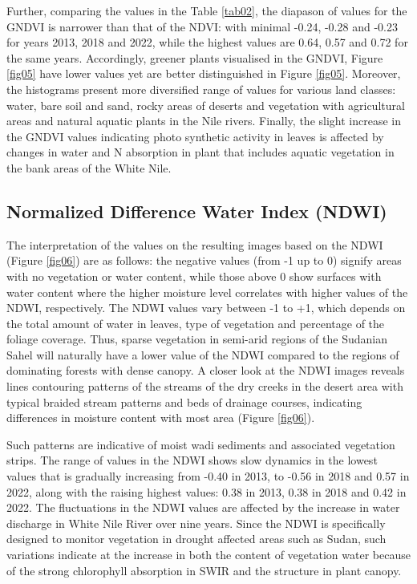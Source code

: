 \documentclass[jimaging,article,submit,pdftex,moreauthors]{Definitions/mdpi}
\begin{document}
Further, comparing the values in the Table \ref{tab02}, the diapason of values for the GNDVI is narrower than that of the NDVI: with minimal -0.24, -0.28 and -0.23 for years 2013, 2018 and 2022, while the highest values are 0.64, 0.57 and 0.72 for the same years. Accordingly, greener plants visualised in the GNDVI, Figure \ref{fig05} have lower values yet are better distinguished in Figure \ref{fig05}. Moreover, the histograms present more diversified range of values for various land classes: water, bare soil and sand, rocky areas of deserts and vegetation with agricultural areas and natural aquatic plants in the Nile rivers. Finally, the slight increase in the GNDVI values indicating photo synthetic activity in leaves is affected by changes in water and N absorption in plant that includes aquatic vegetation in the bank areas of the White Nile. 

\subsection{Normalized Difference Water Index (NDWI)}

The interpretation of the values on the resulting images based on the NDWI (Figure \ref{fig06}) are as follows: the negative values (from -1 up to 0) signify areas with no vegetation or water content, while those above 0 show surfaces with water content where the higher moisture level correlates with higher values of the NDWI, respectively. The NDWI values vary between -1 to +1, which depends on the total amount of water in leaves, type of vegetation and percentage of the foliage coverage. Thus, sparse vegetation in semi-arid regions of the Sudanian Sahel will naturally have a lower value of the NDWI compared to the regions of dominating forests with dense canopy. A closer look at the NDWI images reveals lines contouring patterns of the streams of the dry creeks in the desert area with typical  braided stream patterns and beds of drainage courses, indicating differences in moisture content with most area (Figure \ref{fig06}). 

Such patterns are indicative of moist wadi sediments and associated vegetation strips. The range of values in the NDWI shows slow dynamics in the lowest values that is gradually increasing from -0.40 in 2013, to -0.56 in 2018 and 0.57 in 2022, along with the raising highest values: 0.38 in 2013, 0.38 in 2018 and 0.42 in 2022. The fluctuations in the NDWI values are affected by the increase in water discharge in White Nile River over nine years. Since the NDWI is specifically designed to monitor vegetation in drought affected areas such as Sudan, such variations indicate at the increase in both the content of vegetation water because of the strong chlorophyll absorption in SWIR and the structure in plant canopy. 
\end{document}
